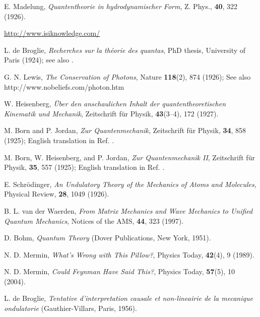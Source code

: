 \documentclass[onecolumn,nofootinbib, secnumarabic, amsmath, nobibnotes,11pt,aps,pra]{revtex4-1}
\begin{document}
\begin{thebibliography}{999}
E. Madelung, \emph{Quantentheorie in hydrodynamischer Form}, Z. Phys., \textbf{40},  322 (1926).

\url{http://www.isiknowledge.com/}

L. de Broglie, \emph{Recherches sur la th\'{e}orie des quantas}, PhD
thesis, University of Paris (1924); see also \cite{om.dB_AnnPhys}.

G. N. Lewis, \emph{The Conservation of Photons}, Nature \textbf{118}(2),  874 (1926); See also http://www.nobeliefs.com/photon.htm

W. Heisenberg, \emph{\"{U}ber den anschaulichen Inhalt der quantentheoretischen Kinematik und Mechanik}, Zeitschrift f\"{u}r Physik, \textbf{43}(3--4),  172 (1927).

M. Born and P. Jordan, \emph{Zur Quantenmechanik}, Zeitschrift f\"{u}r Physik, \textbf{34},  858 (1925); English translation in Ref. \cite{om.waerden}.

M. Born, W. Heisenberg, and P. Jordan, \emph{Zur Quantenmechanik II}, Zeitschrift f\"{u}r Physik, \textbf{35},  557 (1925); English translation in Ref. \cite{om.waerden}.

E. Schr\"odinger, \emph{An Undulatory Theory of the Mechanics of Atoms and Molecules}, Physical Review, \textbf{28},  1049 (1926).

B. L. van der Waerden, \emph{From Matrix Mechanics and Wave Mechanics to Unified Quantum Mechanics}, Notices of the AMS, \textbf{44},  323 (1997).

D. Bohm, \emph{Quantum Theory} (Dover Publications, New York, 1951).

N. D. Mermin, \emph{What's Wrong with This Pillow?}, Physics Today, \textbf{42}(4),  9 (1989).

N. D. Mermin, \emph{Could Feynman Have Said This?}, Physics Today, \textbf{57}(5),  10 (2004).

L. de Broglie, \emph{Tentative d'interpretation causale et
non-lineairie de la mecanique ondulatorie} (Gauthier-Villars, Paris,
1956).


\end{thebibliography}
\end{document}
